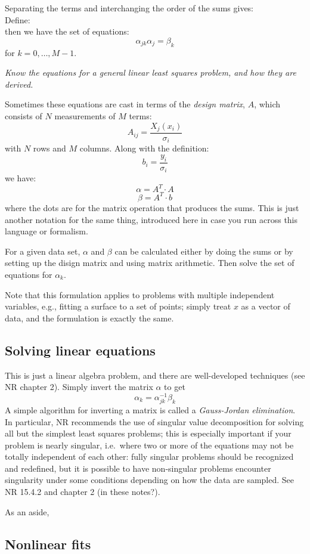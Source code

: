 \documentclass[12pt]{article}
\begin{document}
Separating the terms and interchanging the order of the sums gives:
$$ $$
Define:
$$ $$
$$ $$
then we have the set of equations:
$$ \alpha_{jk}\alpha_{j} = \beta_{k} $$
for $k=0,\ldots,M-1$.

\colorbox{hl}{\parbox{0.9\textwidth}
{\emph{Know the equations for a general linear least squares
problem, and how they are derived.}}}

Sometimes these equations are cast in terms of the \emph{design matrix},
$A$, which consists of $N$ measurements of $M$ terms:
$$ A_{ij} = \frac{X_j(x_i)}{\sigma_i}  $$
with $N$ rows and $M$ columns. Along with the definition:
$$ b_i = \frac{y_i}{\sigma_i} $$
we have:
$$ \alpha = A^T \cdot A $$
$$ \beta = A^T \cdot b $$
where the dots are for the matrix operation that produces the sums.
This is just another notation for the same thing, introduced here in
case you run across this language or formalism.

For a given data set, $\alpha$ and $\beta$ can be calculated either
by doing the sums or by setting up the disign matrix and using matrix
arithmetic. Then solve the set of equations for $\alpha_k$.

Note that this formulation applies to problems with multiple
independent variables, e.g., fitting a surface to a set of points;
simply treat $x$ as a vector of data, and the formulation is exactly
the same.

\subsection{Solving linear equations}

This is just a linear algebra problem, and there are well-developed
techniques (see NR chapter 2). Simply invert the matrix $\alpha$
to get
$$ \alpha_k = \alpha_{jk}^{-1}\beta_k $$
A simple algorithm for inverting a matrix is called a
\emph{Gauss-Jordan elimination}. In particular, NR recommends
the use of singular value decomposition for solving all but the
simplest least squares problems; this is especially important if
your problem is nearly singular, i.e.\ where two or more of the
equations may not be totally independent of each other:
fully singular problems should be recognized and redefined,
but it is possible to have non-singular problems encounter
singularity under some conditions depending on how the data are
sampled. See NR 15.4.2 and chapter 2 (in these notes?).

As an aside,

\subsection{Nonlinear fits}
\end{document}
